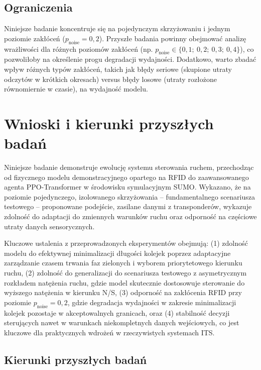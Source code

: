 \documentclass[10pt,a4paper]{article}
\begin{document}
\subsection{Ograniczenia}

Niniejsze badanie koncentruje się na pojedynczym skrzyżowaniu i jednym poziomie zakłóceń ($p_{\text{noise}} = 0{,}2$). Przyszłe badania powinny obejmować analizę wrażliwości dla różnych poziomów zakłóceń (np. $p_{\text{noise}} \in \{0{,}1;\ 0{,}2;\ 0{,}3;\ 0{,}4\}$), co pozwoliłoby na określenie progu degradacji wydajności. Dodatkowo, warto zbadać wpływ różnych typów zakłóceń, takich jak błędy seriowe (skupione utraty odczytów w krótkich okresach) versus błędy losowe (utraty rozłożone równomiernie w czasie), na wydajność modelu.

\section{Wnioski i kierunki przyszłych badań}

Niniejsze badanie demonstruje ewolucję systemu sterowania ruchem, przechodząc od fizycznego modelu demonstracyjnego opartego na RFID do zaawansowanego agenta PPO-Transformer w środowisku symulacyjnym SUMO. Wykazano, że na poziomie pojedynczego, izolowanego skrzyżowania -- fundamentalnego scenariusza testowego -- proponowane podejście, zasilane danymi z transponderów, wykazuje zdolność do adaptacji do zmiennych warunków ruchu oraz odporność na częściowe utraty danych sensorycznych.

Kluczowe ustalenia z przeprowadzonych eksperymentów obejmują: (1) zdolność modelu do efektywnej minimalizacji długości kolejek poprzez adaptacyjne zarządzanie czasem trwania faz zielonych i wyborem priorytetowego kierunku ruchu, (2) zdolność do generalizacji do scenariusza testowego z asymetrycznym rozkładem natężenia ruchu, gdzie model skutecznie dostosowuje sterowanie do wyższego natężenia w kierunku N/S, (3) odporność na zakłócenia RFID przy poziomie $p_{\text{noise}} = 0{,}2$, gdzie degradacja wydajności w zakresie minimalizacji kolejek pozostaje w akceptowalnych granicach, oraz (4) stabilność decyzji sterujących nawet w warunkach niekompletnych danych wejściowych, co jest kluczowe dla praktycznych wdrożeń w rzeczywistych systemach ITS.

\subsection{Kierunki przyszłych badań}
\end{document}
